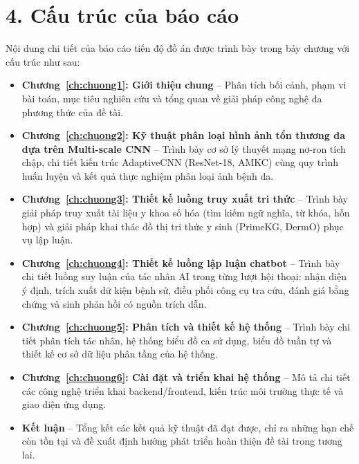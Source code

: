\section*{4. Cấu trúc của báo cáo}

Nội dung chi tiết của báo cáo tiến độ đồ án được trình bày trong bảy chương với cấu trúc như sau:

\begin{itemize}
  \item \textbf{Chương~\ref{ch:chuong1}: Giới thiệu chung} -- Phân tích bối cảnh, phạm vi bài toán, mục tiêu nghiên cứu và tổng quan về giải pháp công nghệ đa phương thức của đề tài.
  \item \textbf{Chương~\ref{ch:chuong2}: Kỹ thuật phân loại hình ảnh tổn thương da dựa trên Multi-scale CNN} -- Trình bày cơ sở lý thuyết mạng nơ-ron tích chập, chi tiết kiến trúc AdaptiveCNN (ResNet-18, AMKC) cùng quy trình huấn luyện và kết quả thực nghiệm phân loại ảnh bệnh da.
  \item \textbf{Chương~\ref{ch:chuong3}: Thiết kế luồng truy xuất tri thức} -- Trình bày giải pháp truy xuất tài liệu y khoa số hóa (tìm kiếm ngữ nghĩa, từ khóa, hỗn hợp) và giải pháp khai thác đồ thị tri thức y sinh (PrimeKG, DermO) phục vụ lập luận.
  \item \textbf{Chương~\ref{ch:chuong4}: Thiết kế luồng lập luận chatbot} -- Trình bày chi tiết luồng suy luận của tác nhân AI trong từng lượt hội thoại: nhận diện ý định, trích xuất dữ kiện bệnh sử, điều phối công cụ tra cứu, đánh giá bằng chứng và sinh phản hồi có nguồn trích dẫn.
  \item \textbf{Chương~\ref{ch:chuong5}: Phân tích và thiết kế hệ thống} -- Trình bày chi tiết phân tích tác nhân, hệ thống biểu đồ ca sử dụng, biểu đồ tuần tự và thiết kế cơ sở dữ liệu phân tầng của hệ thống.
  \item \textbf{Chương~\ref{ch:chuong6}: Cài đặt và triển khai hệ thống} -- Mô tả chi tiết các công nghệ triển khai backend/frontend, kiến trúc môi trường thực tế và giao diện ứng dụng.
  \item \textbf{Kết luận} -- Tổng kết các kết quả kỹ thuật đã đạt được, chỉ ra những hạn chế còn tồn tại và đề xuất định hướng phát triển hoàn thiện đề tài trong tương lai.
\end{itemize}
